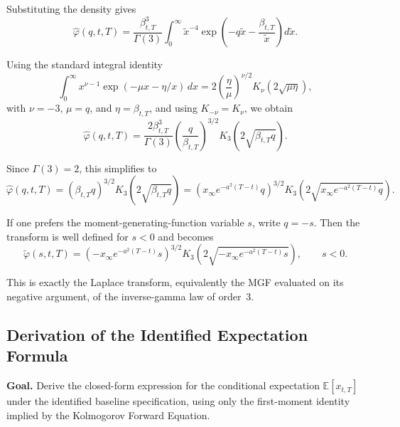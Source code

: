 \documentclass[12pt]{article}
\theoremstyle{statementstyle}
\begin{document}
\begin{appendices}
Substituting the density gives
\begin{equation}
\widehat{\varphi}(q,t,T)
=
\frac{\beta_{t,T}^{3}}{\Gamma(3)}
\int_{0}^{\infty}
\widetilde{x}^{-4}
\exp\!\left(
-q\widetilde{x}
-\frac{\beta_{t,T}}{\widetilde{x}}
\right)
d\widetilde{x}.
\tag{B.2.1}
\end{equation}

Using the standard integral identity
\[
\int_{0}^{\infty}
x^{\nu-1}
\exp\!\left(-\mu x-\eta/x\right)\,dx
=
2\left(\frac{\eta}{\mu}\right)^{\nu/2}
K_{\nu}\!\left(2\sqrt{\mu\eta}\right),
\]
with \(\nu=-3\), \(\mu=q\), and \(\eta=\beta_{t,T}\), and using
\(K_{-\nu}=K_{\nu}\), we obtain
\begin{equation}
\widehat{\varphi}(q,t,T)
=
\frac{2\beta_{t,T}^{3}}{\Gamma(3)}
\left(\frac{q}{\beta_{t,T}}\right)^{3/2}
K_{3}\!\left(2\sqrt{\beta_{t,T}q}\right).
\tag{B.2.2}
\end{equation}

Since \(\Gamma(3)=2\), this simplifies to
\begin{equation}
\widehat{\varphi}(q,t,T)
=
(\beta_{t,T}q)^{3/2}
K_{3}\!\left(2\sqrt{\beta_{t,T}q}\right)
=
\left(
x_{\infty}e^{-a^{2}(T-t)}q
\right)^{3/2}
K_{3}\!\left(
2\sqrt{x_{\infty}e^{-a^{2}(T-t)}q}
\right).
\tag{B.2.3}
\end{equation}

If one prefers the moment-generating-function variable \(s\), write \(q=-s\).
Then the transform is well defined for \(s<0\) and becomes
\begin{equation}
\widetilde{\varphi}(s,t,T)
=
\left(
-x_{\infty}e^{-a^{2}(T-t)}s
\right)^{3/2}
K_{3}\!\left(
2\sqrt{-x_{\infty}e^{-a^{2}(T-t)}s}
\right),
\qquad s<0.
\tag{B.2.4}
\end{equation}

This is exactly the Laplace transform, equivalently the MGF evaluated on its
negative argument, of the inverse-gamma law of order~3.

\subsection{Derivation of the Identified Expectation Formula}
\label{appendix:B3}

\textbf{Goal.}
Derive the closed-form expression for the conditional expectation
$\mathbb{E}[x_{t,T}]$ under the identified baseline specification, using
only the first-moment identity implied by the Kolmogorov Forward Equation.


\end{appendices}
\end{document}
